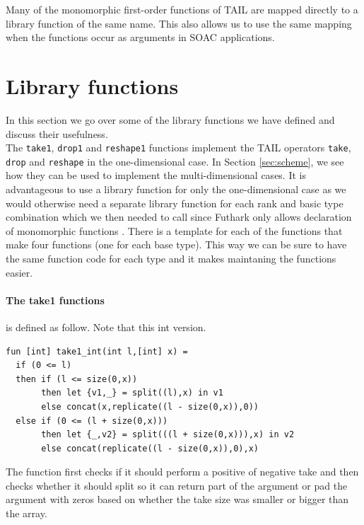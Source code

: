 \documentclass[11pt]{article}
\begin{document}
Many of the monomorphic first-order functions of TAIL are mapped directly to a library function of the same name. This also allows us to use the same mapping when the functions occur as arguments in SOAC applications.\\


\section{Library functions}
In this section we go over some of the library functions we have defined and discuss their usefulness.\\

The {\tt take1}, {\tt drop1} and {\tt reshape1} functions implement the TAIL operators {\tt take}, {\tt drop} and {\tt reshape} in the one-dimensional case. In Section \ref{sec:scheme}, we see how they can be used to implement the multi-dimensional cases. It is advantageous to use a library function for only the one-dimensional case as we would otherwise need a separate library function for each 
rank and basic type combination which we then needed to call since Futhark only allows declaration of monomorphic functions \cite{TroelsHenriksen}.
There is a template for each of the functions that make four functions (one for each base type). This way we can be sure to have the same function code for each type and it makes maintaning the functions easier. 

\paragraph{The take1 functions} is defined as follow. Note that this int version.
\begin{lstlisting}[language=Futhark]
fun [int] take1_int(int l,[int] x) =
  if (0 <= l)
  then if (l <= size(0,x))
       then let {v1,_} = split((l),x) in v1
       else concat(x,replicate((l - size(0,x)),0))
  else if (0 <= (l + size(0,x)))
       then let {_,v2} = split(((l + size(0,x))),x) in v2
       else concat(replicate((l - size(0,x)),0),x)
\end{lstlisting}

The function first checks if it should perform a positive of negative take and then checks whether it should split so it can return
part of the argument or pad the argument with zeros based on whether the take size was smaller or bigger than the array.
\end{document}
